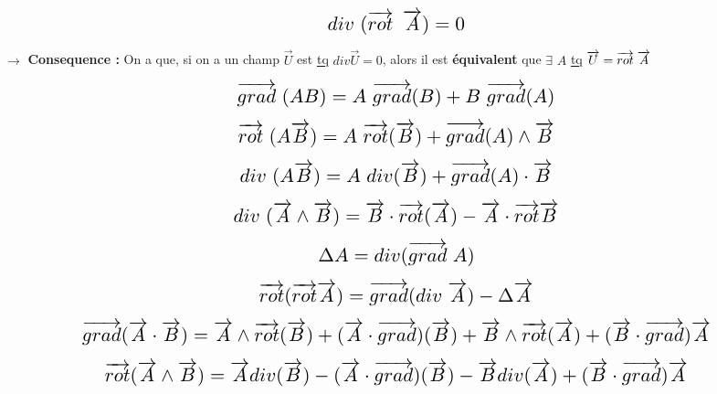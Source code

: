 \documentclass{article}
\begin{document}
$$\scalebox{1.5}{$\displaystyle div \hspace{3px}( \overrightarrow{rot} \hspace{5px} \overrightarrow{A} ) = 0 $}$$

$\longrightarrow$ \textbf{{\Large Consequence :}} On a que, si on a un champ $\overrightarrow{U}$ est \underline{tq} $div \overrightarrow{U} = 0$, alors il est \textbf{équivalent} que $\exists$ $A$ \underline{tq} $\overrightarrow{U} = \overrightarrow{rot} \hspace{3px} \overrightarrow{A}$

$$\scalebox{1.5}{$\displaystyle \overrightarrow{grad} \hspace{3px}(AB) = A \hspace{3 px} \overrightarrow{grad}(B) +  B \hspace{3 px} \overrightarrow{grad}(A) $}$$

$$\scalebox{1.5}{$\displaystyle \overrightarrow{rot} \hspace{3px}(A \overrightarrow{B} ) = A \hspace{3 px} \overrightarrow{rot}( \overrightarrow{B} ) + \overrightarrow{grad}(A) \wedge \overrightarrow{B} $}$$

$$\scalebox{1.5}{$\displaystyle div \hspace{3px}(A \overrightarrow{B} ) = A \hspace{3 px} div( \overrightarrow{B} ) + \overrightarrow{grad}(A) \cdot \overrightarrow{B} $}$$

$$\scalebox{1.5}{$\displaystyle div \hspace{3px}(\overrightarrow{A} \wedge \overrightarrow{B} ) = \overrightarrow{B} \cdot \overrightarrow{rot}( \overrightarrow{A} ) - \overrightarrow{A} \cdot \overrightarrow{rot} \overrightarrow{B} $}$$

$$\scalebox{1.5}{$\displaystyle \Delta A = div ( \overrightarrow{grad} \hspace{3px} A ) $}$$

$$\scalebox{1.5}{$\displaystyle \overrightarrow{rot} (\overrightarrow{rot} \overrightarrow{A} ) = \overrightarrow{grad} (div \hspace{3px} \overrightarrow{A} ) - \Delta \overrightarrow{A} $}$$

$$\scalebox{1.5}{$\displaystyle \overrightarrow{grad} (\overrightarrow{A} \cdot \overrightarrow{B} ) = \overrightarrow{A} \wedge \overrightarrow{rot}(\overrightarrow{B}) + (\overrightarrow{A} \cdot \overrightarrow{grad})(\overrightarrow{B}) + \overrightarrow{B} \wedge \overrightarrow{rot}(\overrightarrow{A}) + ( \overrightarrow{B} \cdot \overrightarrow{grad} ) \overrightarrow{A} $}$$

$$\scalebox{1.5}{$\displaystyle \overrightarrow{rot} (\overrightarrow{A} \wedge \overrightarrow{B} ) = \overrightarrow{A} div(\overrightarrow{B}) - (\overrightarrow{A} \cdot \overrightarrow{grad})(\overrightarrow{B}) - \overrightarrow{B} div(\overrightarrow{A}) + ( \overrightarrow{B} \cdot \overrightarrow{grad} ) \overrightarrow{A} $}$$
\end{document}
